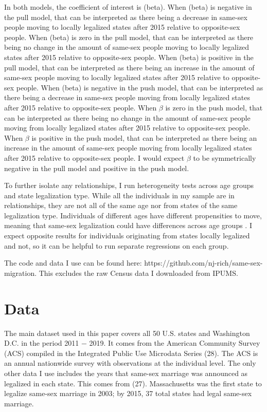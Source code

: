 \documentclass[12pt,letterpaper]{article}
\begin{document}
In both models, the coefficient of interest is (beta). When (beta) is negative in the pull model, that can be interpreted as there being a decrease in same-sex people moving to locally legalized states after 2015 relative to opposite-sex people. When (beta) is zero in the pull model, that can be interpreted as there being no change in the amount of same-sex people moving to locally legalized states after 2015 relative to opposite-sex people. When (beta) is positive in the pull model, that can be interpreted as there being an increase in the amount of same-sex people moving to locally legalized states after 2015 relative to opposite-sex people. When (beta) is negative in the push model, that can be interpreted as there being a decrease in same-sex people moving from locally legalized states after 2015 relative to opposite-sex people. When $\beta$ is zero in the push model, that can be interpreted as there being no change in the amount of same-sex people moving from locally legalized states after 2015 relative to opposite-sex people. When $\beta$ is positive in the push model, that can be interpreted as there being an increase in the amount of same-sex people moving from locally legalized states after 2015 relative to opposite-sex people. I would expect $\beta$ to be symmetrically negative in the pull model and positive in the push model.

To further isolate any relationships, I run heterogeneity tests across age groups and state legalization type. While all the individuals in my sample are in relationships, they are not all of the same age nor from states of the same legalization type. Individuals of different ages have different propensities to move, meaning that same-sex legalization could have differences across age groups \citep{1, 17}.  I expect opposite results for individuals originating from states locally legalized and not, so it can be helpful to run separate regressions on each group.

The code and data I use can be found here: https://github.com/nj-rich/same-sex-migration. This excludes the raw Census data I downloaded from IPUMS.

\section{Data}

The main dataset used in this paper covers all 50 U.S. states and Washington D.C. in the period 2011 − 2019. It comes from the American Community Survey (ACS) compiled in the Integrated Public Use Microdata Series (28). The ACS is an annual nationwide survey with observations at the individual level. The only other data I use includes the years that same-sex marriage was announced as legalized in each state. This comes from (27). Massachusetts was the first state to legalize same-sex marriage in 2003; by 2015, 37 total states had legal same-sex marriage.
\end{document}
